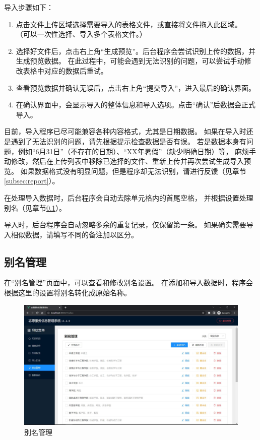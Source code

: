 \documentclass[12pt,titlepage]{article}
\begin{document}
导入步骤如下：

\begin{enumerate}
    \item 点击文件上传区域选择需要导入的表格文件，或直接将文件拖入此区域。
          （可以一次性选择、导入多个表格文件。）
    \item 选择好文件后，点击右上角“生成预览”。后台程序会尝试识别上传的数据，并生成预览数据。
          在此过程中，可能会遇到无法识别的问题，可以尝试手动修改表格中对应的数据后重试。
    \item 查看预览数据并确认无误后，点击右上角“提交导入”，进入最后的确认界面。
    \item 在确认界面中，会显示导入的整体信息和导入选项。点击“确认”后数据会正式导入。
\end{enumerate}

目前，导入程序已尽可能兼容各种内容格式，尤其是日期数据。
如果在导入时还是遇到了无法识别的问题，请先根据提示检查数据是否有误。
若是数据本身有问题，例如“6月31日”（不存在的日期）、“XX年暑假”（缺少明确日期）等，
麻烦手动修改，然后在上传列表中移除已选择的文件、重新上传并再次尝试生成导入预览。
如果数据格式没有明显问题，但是程序却无法识别，请进行反馈（见章节\ref{subsec:report}）。

\begin{warnings}
    \item 在处理导入数据时，后台程序会自动去除单元格内的首尾空格，
    并根据设置处理别名（见章节\ref{subsec:alias}）。
    \item 导入时，后台程序会自动忽略多余的重复记录，仅保留第一条。
    如果确实需要导入相似数据，请填写不同的备注加以区分。
\end{warnings}

\subsection{别名管理}
\label{subsec:alias}

在“别名管理”页面中，可以查看和修改别名设置。
在添加和导入数据时，程序会根据这里的设置将别名转化成原始名称。

\begin{figure}[htbp]
    \centering
    \includegraphics[width=\textwidth]{../screenshots/alias.jpg}
    \caption{别名管理}
\end{figure}
\end{document}
